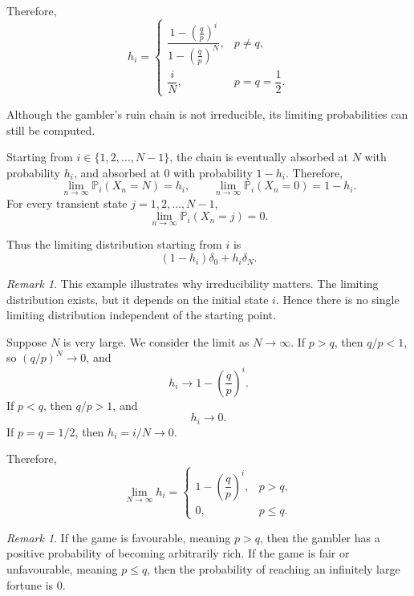 \documentclass[11pt]{article}
\theoremstyle{plain}
\theoremstyle{definition}
\theoremstyle{remark}
\newtheorem{remark}[theorem]{Remark}
\begin{document}
	Therefore,
	\[
	h_i
	=
	\begin{cases}
		\dfrac{1-\left(\frac{q}{p}\right)^i}
		{1-\left(\frac{q}{p}\right)^N},
		& p\neq q,\\[12pt]
		\dfrac{i}{N},
		& p=q=\dfrac12.
	\end{cases}
	\]
	
	
	
	
	
	Although the gambler's ruin chain is not irreducible, its limiting probabilities can still be computed.
	
	Starting from \(i\in\{1,2,\dots,N-1\}\), the chain is eventually absorbed at \(N\) with probability \(h_i\), and absorbed at \(0\) with probability \(1-h_i\). Therefore,
	\[
	\lim_{n\to\infty}\mathbb{P}_i(X_n=N)=h_i,
	\qquad
	\lim_{n\to\infty}\mathbb{P}_i(X_n=0)=1-h_i.
	\]
	For every transient state \(j=1,2,\dots,N-1\),
	\[
	\lim_{n\to\infty}\mathbb{P}_i(X_n=j)=0.
	\]
	
	Thus the limiting distribution starting from \(i\) is
	\[
	(1-h_i)\delta_0+h_i\delta_N.
	\]
	
	\begin{remark}
		This example illustrates why irreducibility matters. The limiting distribution exists, but it depends on the initial state \(i\). Hence there is no single limiting distribution independent of the starting point.
	\end{remark}
	
	
	
	
	
	Suppose \(N\) is very large. We consider the limit as \(N\to\infty\). If \(p>q\), then \(q/p<1\), so \((q/p)^N\to 0\), and
	\[
	h_i\to 1-\left(\frac{q}{p}\right)^i.
	\]
	If \(p<q\), then \(q/p>1\), and
	\[
	h_i\to 0.
	\]
	If \(p=q=1/2\), then \(h_i=i/N\to 0\).
	
	Therefore,
	\[
	\lim_{N\to\infty}h_i
	=
	\begin{cases}
		1-\left(\dfrac{q}{p}\right)^i,
		& p>q,\\[10pt]
		0,
		& p\le q.
	\end{cases}
	\]
	
	\begin{remark}
		If the game is favourable, meaning \(p>q\), then the gambler has a positive probability of becoming arbitrarily rich. If the game is fair or unfavourable, meaning \(p\le q\), then the probability of reaching an infinitely large fortune is \(0\).
	\end{remark}
	
	
	
\end{document}
